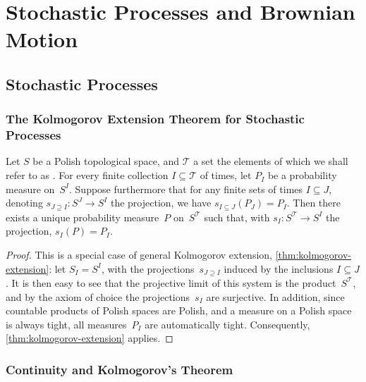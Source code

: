 \chapter	{Stochastic Processes and Brownian Motion}

\section	{Stochastic Processes}

\subsection	{The Kolmogorov Extension Theorem for Stochastic Processes}

\begin	{theorem}
\label	{thm:kolmogorov-extension-for-processes}
Let $S$ be a Polish topological space,
and $\mathcal T$ a set the elements of which we shall refer to as .
For every finite collection \( I \subseteq \mathcal T \) of times,
let \( P_I \) be a probability measure on~$S^I$.
Suppose furthermore that for any finite sets of times \( I \subseteq J \),
denoting \( s_{J \supseteq I} \colon S^J \to S^I \) the projection,
we have \( s_{I \subseteq J}(P_J) = P_I \).
Then there exists a unique probability measure~$P$ on~$S^{\mathcal T}$
such that, with \( s_I \colon S^{\mathcal T} \to S^I \)
the projection, \( s_I(P) = P_I \).
\end	{theorem}
\begin	{proof}
This is a special case of general Kolmogorov extension,
\autoref{thm:kolmogorov-extension}:
let \( S_I = S^I \), with the projections~$s_{J \supseteq I}$
induced by the inclusions \( I \subseteq J \).
It is then easy to see that the projective limit of this system
is the product~$S^{\mathcal T}$,
and by the axiom of choice the projections~$s_I$ are surjective.
In addition, since countable products of Polish spaces are Polish,
and a measure on a Polish space is always tight,
all measures~$P_I$ are automatically tight.
Consequently, \autoref{thm:kolmogorov-extension} applies.
\end	{proof}


\subsection	{Continuity and Kolmogorov's Theorem}

